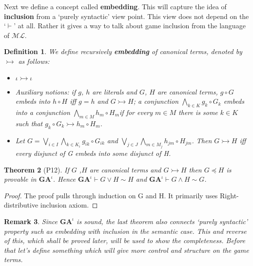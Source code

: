 \documentclass[10pt]{article}
\newcommand{\ml}{\mathcal{ML}}
\newcommand{\id}{\iota}
\newcommand{\cle}{\preccurlyeq}
\newtheorem{theorem}{Theorem}
\newtheorem{definition}[theorem]{Definition}
\newtheorem{remark}[theorem]{Remark}
\begin{document}
		Next we define a concept called  \textbf{embedding}. This will capture the idea of \textbf{inclusion} from a `purely syntactic' view point. This view does not depend on the `$\vdash$' at all. Rather it gives a way to talk about game inclusion from the language of $\ml$. 
		\begin{definition}
			We define recursively \textbf{embedding} of canonical terms, denoted by $\rightarrowtail$ as follows:
			
			\begin{itemize}
				\item $\id \rightarrowtail \iota$
				\item Auxiliary notions: if $g$, $h$ are literals and $G$, $H$ are canonical terms, $g\circ G$
				embeds into $h\circ H$ iﬀ $g=h$ and $G \rightarrowtail H$; a conjunction $\bigwedge_{k \in K}g_k\circ G_k$ embeds into a conjunction $\bigwedge_{m \in M}h_m\circ H_m$if for every $m\in M$ there is some $k\in K$ such that $g_k\circ G_k \rightarrowtail h_m \circ H_m$.
				\item Let $G = \bigvee_{i\in I} \bigwedge_{k \in K_i} g_{ik}\circ G_{ik} $ and $
				\bigvee_{j\in J} \bigwedge_{m \in M_j} h_{jm}\circ H_{jm} $. Then $G \rightarrowtail H$  iff every disjunct of G embeds into some disjunct of H.
			\end{itemize}
		\end{definition}
		
		\begin{theorem}[P12]\label{th9}
			If $G$ ,$H$  are canonical terms and $G\rightarrowtail H$ then $G\cle H$ is	provable in $\textbf{GA}^\id$. Hence $\textbf{GA}^\id \vdash G \lor H \sim H$ and $\textbf{GA}^\id \vdash G \land H \sim G$.
		\end{theorem}
		\begin{proof}
			The proof pulls through induction on G and H. It primarily uses Right-distributive inclusion axiom.
		\end{proof}
		\begin{remark}
			Since $\textbf{GA}^\id$ is sound, the last theorem also connects `purely syntactic' property such as embedding with inclusion in the semantic case. This and reverse  of this, which shall be proved later, will be used to show the completeness. Before that let's define something which will give more control and structure on the game terms. 
		\end{remark} 
\end{document}
